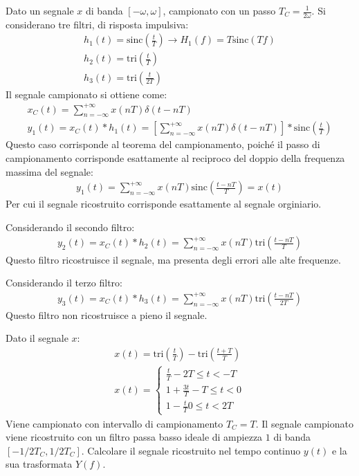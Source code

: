\documentclass{article}
\begin{document}
Dato un segnale $x$ di banda $[-\omega,\omega]$, campionato con un passo $T_C=\displaystyle\frac{1}{2\omega}$. Si considerano tre filtri, di risposta impulsiva:
\begin{gather*}
    h_1(t)=\mbox{sinc}\left(\displaystyle\frac{t}{T}\right)\to H_1(f)=T\mbox{sinc}(Tf)\\
    h_2(t)=\mbox{tri}\left(\displaystyle\frac{t}{T}\right)\\
    h_3(t)=\mbox{tri}\left(\displaystyle\frac{t}{2T}\right)
\end{gather*}
Il segnale campionato si ottiene come:
\begin{gather*}
    x_C(t)=\displaystyle\sum_{n=-\infty}^{+\infty}x(nT)\delta(t-nT)\\
    y_1(t)=x_C(t)*h_1(t)=\left[\displaystyle\sum_{n=-\infty}^{+\infty}x(nT)\delta(t-nT)\right]*\mbox{sinc}\left(\frac{t}{T}\right)
\end{gather*}
Questo caso corrisponde al teorema del campionamento, poiché il passo di campionamento corrisponde esattamente al reciproco del doppio della frequenza massima del segnale:
\begin{gather}
    y_1(t)=\displaystyle\sum_{n=-\infty}^{+\infty}x(nT)\mbox{sinc}\left(\frac{t-nT}{T}\right)=x(t)
\end{gather}
Per cui il segnale ricostruito corrisponde esattamente al segnale orginiario. 

Considerando il secondo filtro:
\begin{gather}
    y_2(t)=x_C(t)*h_2(t)=\displaystyle\sum_{n=-\infty}^{+\infty}x(nT)\mbox{tri}\left(\frac{t-nT}{T}\right)
\end{gather}
Questo filtro ricostruisce il segnale, ma presenta degli errori alle alte frequenze. 

Considerando il terzo filtro:
\begin{gather}
    y_3(t)=x_C(t)*h_3(t)=\displaystyle\sum_{n=-\infty}^{+\infty}x(nT)\mbox{tri}\left(\frac{t-nT}{2T}\right)
\end{gather}
Questo filtro non ricostruisce a pieno il segnale. 


Dato il segnale $x$:
\begin{gather*}
    x(t)=\mbox{tri}\left(\displaystyle\frac{t}{T}\right)-\mbox{tri}\left(\frac{t+T}{T}\right)\\
    x(t)=\begin{cases}
        \displaystyle\frac{t}{T} -2T\leq t<-T\\
        1+\displaystyle\frac{3t}{T} -T\leq t<0\\
        1-\displaystyle\frac{t}{T} 0\leq t<2T
    \end{cases}
\end{gather*}
Viene campionato con intervallo di campionamento $T_C=T$. Il segnale campionato viene ricostruito con un filtro passa basso ideale di ampiezza $1$ di banda $[-1/2T_C,1/2T_C]$. 
Calcolare il segnale ricostruito nel tempo continuo $y(t)$ e la sua trasformata $Y(f)$. 
\end{document}
